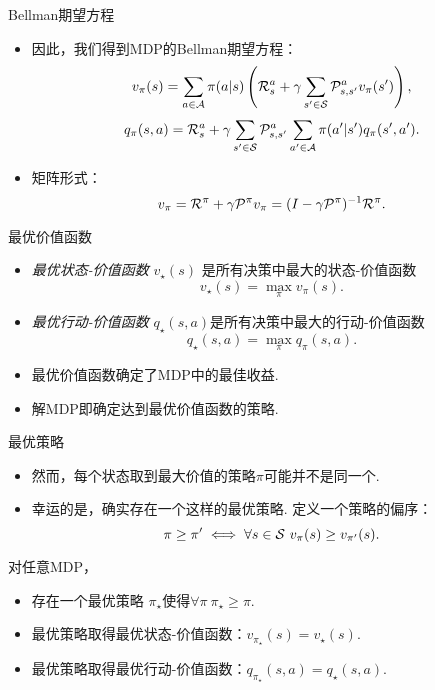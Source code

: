 {Bellman期望方程}
\begin{itemize}
    \item 因此，我们得到MDP的Bellman期望方程：
\[v_\pi(s) = \sum_{a\in \mathcal A}\pi(a|s)\left(\mathcal R_s^a + \gamma \sum_{s'\in \MS}\P_{s,s'}^av_\pi(s')\right),\]
\[q_\pi(s,a) = \mathcal R_s^a + \gamma \sum_{s'\in \MS}\P_{s,s'}^a \sum_{a'\in \mathcal A}\pi(a'|s')q_\pi(s',a').\]
\item 矩阵形式：
\[v_\pi = \mathcal R^\pi + \gamma \P^\pi v_\pi = (I-\gamma \mathcal P^\pi)^{-1}\mathcal R^\pi.\]
\end{itemize}


{最优价值函数}
\begin{itemize}
    \item \emph{最优状态-价值函数} $v_\star(s)$ 是所有决策中最大的状态-价值函数
    \[v_\star(s) = \max_\pi v_\pi(s).\]
    \item \emph{最优行动-价值函数} $q_\star(s,a)$是所有决策中最大的行动-价值函数
    \[q_\star(s,a) = \max_\pi q_\pi(s,a).\]
    \item 最优价值函数确定了MDP中的最佳收益.
    \item 解MDP即确定达到最优价值函数的策略.
\end{itemize}


{最优策略}
\begin{itemize}
    \item 然而，每个状态取到最大价值的策略$\pi$可能并不是同一个.
    \item 幸运的是，确实存在一个这样的最优策略. 定义一个策略的偏序：
    \[\pi\ge\pi' \iff \forall s\in\MS\ v_\pi(s) \ge v_{\pi'}(s).\]
\end{itemize}
\begin{theorem}[MDP解的存在性]
对任意MDP，
\begin{itemize}
    \item 存在一个最优策略 $\pi_\star$使得$\forall \pi\ \pi_\star\ge\pi$.
    \item 最优策略取得最优状态-价值函数：$v_{\pi_\star}(s) = v_\star(s)$.
    \item 最优策略取得最优行动-价值函数：$q_{\pi_\star}(s,a)=q_\star(s,a)$.
\end{itemize}
\end{theorem}


